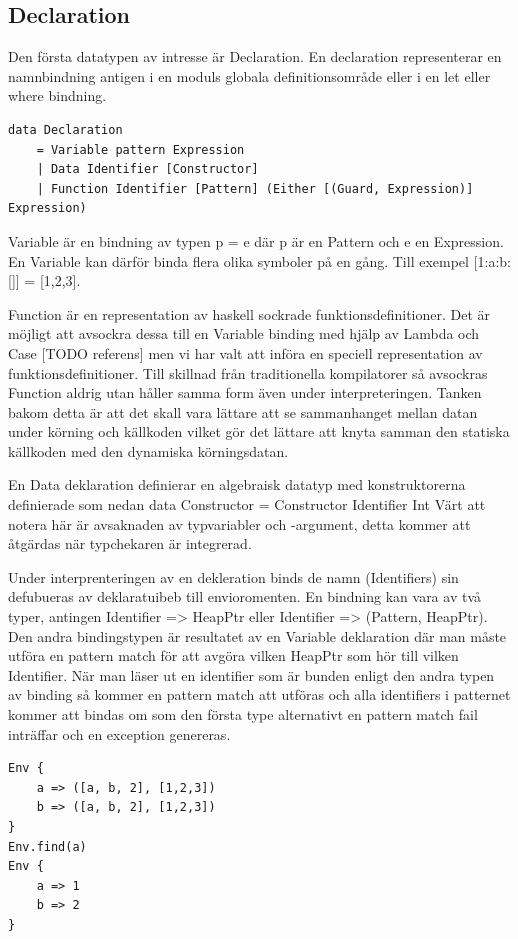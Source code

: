 \subsection{Declaration}
Den första datatypen av intresse är Declaration. En declaration representerar en namnbindning antigen i en moduls globala definitionsområde eller i en let eller where bindning.

\begin{lstlisting}
data Declaration 
    = Variable pattern Expression
    | Data Identifier [Constructor]
    | Function Identifier [Pattern] (Either [(Guard, Expression)] Expression)
\end{lstlisting}

Variable är en bindning av typen p = e där p är en Pattern och e en Expression. En Variable kan därför binda flera olika symboler på en gång. Till exempel [1:a:b:[]] = [1,2,3].

Function är en representation av haskell sockrade funktionsdefinitioner. Det är möjligt att avsockra dessa till en Variable binding med hjälp av Lambda och Case [TODO referens] men vi har valt att införa en speciell representation av funktionsdefinitioner. Till skillnad från traditionella kompilatorer så avsockras Function aldrig utan håller samma form även under interpreteringen. Tanken bakom detta är att det skall vara lättare att se sammanhanget mellan datan under körning och källkoden vilket gör det lättare att knyta samman den statiska källkoden med den dynamiska körningsdatan.

En Data deklaration definierar en algebraisk datatyp med konstruktorerna definierade som nedan
data Constructor = Constructor Identifier Int
Värt att notera här är avsaknaden av typvariabler och -argument, detta kommer att åtgärdas när typchekaren är integrerad.

Under interprenteringen av en dekleration binds de namn (Identifiers) sin defubueras av deklaratuibeb till envioromenten. En bindning kan vara av två typer, antingen Identifier => HeapPtr eller Identifier => (Pattern, HeapPtr). Den andra bindingstypen är resultatet av en Variable deklaration där man måste utföra en pattern match för att avgöra vilken HeapPtr som hör till vilken Identifier. När man läser ut en identifier som är bunden enligt den andra typen av binding så kommer en pattern match att utföras och alla identifiers i patternet kommer att bindas om som den första type alternativt en pattern match fail inträffar och en exception genereras.

\begin{lstlisting}
Env {
    a => ([a, b, 2], [1,2,3])
    b => ([a, b, 2], [1,2,3])
}
Env.find(a)
Env {
    a => 1
    b => 2
}
\end{lstlisting}

